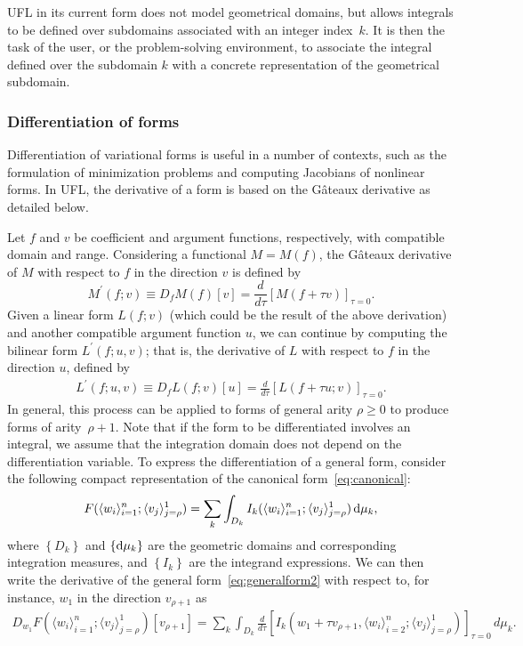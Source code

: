 \documentclass[prodmode,acmtoms]{acmsmall}
\newcommand{\Gateaux}{G\^ateaux}
\begin{document}
UFL in its current form does not model geometrical domains, but allows
integrals to be defined over subdomains associated with an integer
index~$k$. It is then the task of the user, or the problem-solving
environment, to associate the integral defined over the subdomain $k$
with a concrete representation of the geometrical subdomain.

\subsubsection{Differentiation of forms}

Differentiation of variational forms is useful in a number of
contexts, such as the formulation of minimization problems and
computing Jacobians of nonlinear forms. In UFL, the derivative of a
form is based on the \Gateaux{} derivative as detailed below.

Let $f$ and $v$ be coefficient and argument functions, respectively,
with compatible domain and range. Considering a functional $M = M(f)$, the
\Gateaux{} derivative of $M$ with respect to $f$ in the direction $v$ is
defined by
\begin{equation}
  \label{eq:diffdef}
  M^{\prime}(f; v) \equiv D_f M(f)[v] = \frac{d}{d\tau} \left[M(f + \tau v)\right]_{\tau=0}.
\end{equation}
Given a linear form $L(f; v)$ (which could be the result of the above
derivation) and another compatible argument function $u$, we can
continue by computing the bilinear form $L^{\prime}(f; u, v)$; that
is, the derivative of $L$ with respect to $f$ in the direction $u$,
defined by
\begin{align}
  L^{\prime}(f; u, v) \equiv
  D_f L(f; v)[u]
  = \frac{d}{d\tau} \left[L(f + \tau u; v)\right]_{\tau=0}.
\end{align}
In general, this process can be applied to forms of general arity $\rho
\geq 0$ to produce forms of arity~$\rho + 1$. Note that if the form to
be differentiated involves an integral, we assume that the integration
domain does not depend on the differentiation variable. To express
the differentiation of a general form, consider the following compact
representation of the canonical form~\eqref{eq:canonical}:
\begin{align}
  \label{eq:generalform2}
  F(\langle w_i \rangle_{i=1}^{n}; \langle v_j \rangle_{j=\rho}^{1})
  = \sum_k \int_{D_k} I_k(\langle w_i \rangle_{i=1}^{n};
  \langle v_j \rangle_{j=\rho}^{1}) \dif \mu_k,
\end{align}
where $\left\{D_k\right\}$ and $\left\{\dif\mu_k\right\}$ are the
geometric domains and corresponding integration measures, and
$\left\{I_k\right\}$ are the integrand expressions. We can then write
the derivative of the general form~\eqref{eq:generalform2} with
respect to, for instance, $w_1$ in the direction $v_{\rho+1}$ as
\begin{align}
  \label{eq:generalderivative}
D_{w_1}F(\langle w_i \rangle_{i=1}^{n}; \langle v_j \rangle_{j=\rho}^{1})[v_{\rho+1} ]
    = \sum_k \int_{D_k} \frac{d}{d\tau} \left[
      I_k(w_1 + \tau v_{\rho+1}, \langle w_i \rangle_{i=2}^{n};
      \langle v_j \rangle_{j=\rho}^{1}) \right]_{\tau=0} \, d\mu_k.
\end{align}
\end{document}
